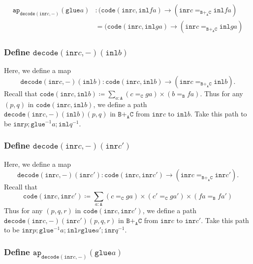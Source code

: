 \message{ !name(notes.tex)}\documentclass[12pt]{amsart}
\newcommand{\from}{\colon}
\newcommand{\inv}{^{-1}}
\newcommand{\type}[1]{\mathtt{#1}}
\newcommand{\tin}{\colon}
\newcommand{\A}{\type{A}}
\newcommand{\B}{\type{B}}
\newcommand{\C}{\type{C}}
\newcommand{\BAC}{\B +_{\A} \C}
\newcommand{\ap}{\type{ap}}
\newcommand{\inl}{\type{inl}}
\newcommand{\inr}{\type{inr}}
\newcommand{\glue}{\type{glue}}
\newcommand{\code}{\type{code}}
\newcommand{\decode}{\type{decode}}
\theoremstyle{remark}
\theoremstyle{definition}
\begin{document}
\begin{align*}
  \ap_{\decode ( \inr c , - )} (\glue a) &
  \tin
  ( \code ( \inr c , \inl fa ) \to ( \inr c =_{\BAC} \inl fa ) \\
  & =
  ( \code ( \inr c , \inl ga ) \to ( \inr c =_{\BAC} \inl ga )
\end{align*}

\subsubsection{Define \( \decode ( \inr c , - ) ( \inl b ) \)} %

Here, we define a map
\[
  \decode ( \inr c , - ) ( \inl b )
  \from
  \code ( \inr c , \inl b )
  \to
  ( \inr c =_{\BAC} \inl b ).
\]
Recall that \( \code ( \inr c , \inl b ) \coloneqq \sum\limits_{a \tin
\A} ( c =_{\C} ga ) \times ( b =_{\B} fa ) \). Thus for any \( ( p,q )
\) in \( \code ( \inr c , \inl b ) \), we define a path \( \decode (
\inr c , - ) ( \inl b ) ( p,q ) \) in \( \BAC \) from \( \inr c \) to
\( \inl b \).  Take this path to be \( \inr p ; \glue^{-1}  a ; \inl q^{-1} \).

\subsubsection{Define \( \decode ( \inr c , - ) ( \inr c' ) \)} %

Here, we define a map
\[
  \decode ( \inr c , - ) ( \inr c' )
  \from
  \code ( \inr c , \inr c' )
  \to
  ( \inr c =_{\BAC} \inr c' ).
\]
Recall that
\[
  \code ( \inr c , \inr c' ) \coloneqq
  \sum\limits_{a \tin \A}
  ( c =_{\C} ga ) \times ( c' =_{\C} ga' ) \times ( fa =_{\B} fa' ) 
\]
Thus for any \( ( p,q,r ) \) in \( \code ( \inr c , \inr c' ) \), we define a path \( \decode (
\inr c , - ) ( \inr c' ) ( p,q,r ) \) in \( \BAC \) from \( \inr c \) to
\( \inr c' \).  Take this path to be \( \inr p ; \glue\inv a ; \inl r
\glue a' ; \inr q\inv \).

\subsubsection{Define \( \ap_{\decode ( \inr c , - )} (\glue a) \)} %
\end{document}
